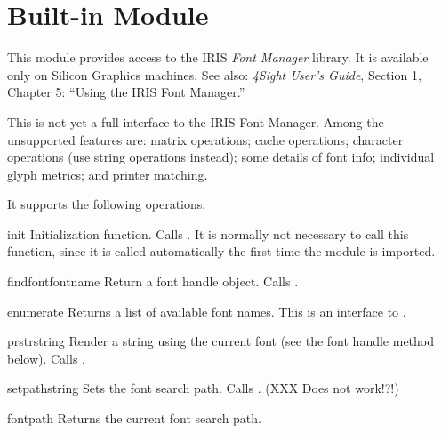 \section{Built-in Module }



This module provides access to the IRIS \emph{Font Manager} library.
It is available only on Silicon Graphics machines.
See also: \emph{4Sight User's Guide}, Section 1, Chapter 5: ``Using
the IRIS Font Manager.''

This is not yet a full interface to the IRIS Font Manager.
Among the unsupported features are: matrix operations; cache
operations; character operations (use string operations instead); some
details of font info; individual glyph metrics; and printer matching.

It supports the following operations:

\begin{funcdesc}{init}{}
Initialization function.
Calls .
It is normally not necessary to call this function, since it is called
automatically the first time the  module is imported.
\end{funcdesc}

\begin{funcdesc}{findfont}{fontname}
Return a font handle object.
Calls .
\end{funcdesc}

\begin{funcdesc}{enumerate}{}
Returns a list of available font names.
This is an interface to .
\end{funcdesc}

\begin{funcdesc}{prstr}{string}
Render a string using the current font (see the  font
handle method below).
Calls .
\end{funcdesc}

\begin{funcdesc}{setpath}{string}
Sets the font search path.
Calls .
(XXX Does not work!?!)
\end{funcdesc}

\begin{funcdesc}{fontpath}{}
Returns the current font search path.
\end{funcdesc}


